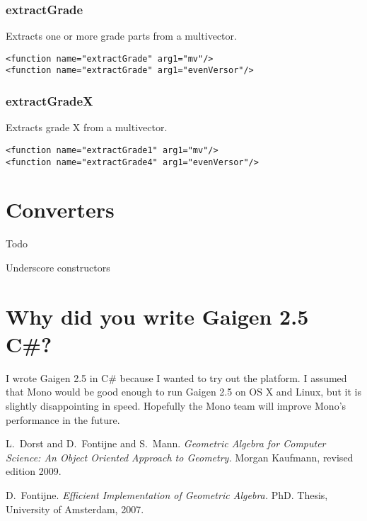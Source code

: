 \documentclass[10pt, a4paper]{article}
\begin{document}
\subsubsection*{extractGrade}

Extracts one or more grade parts from a multivector.
\begin{verbatim}
<function name="extractGrade" arg1="mv"/>
<function name="extractGrade" arg1="evenVersor"/>
\end{verbatim}

\subsubsection*{extractGradeX}

Extracts grade X from a multivector.
\begin{verbatim}
<function name="extractGrade1" arg1="mv"/>
<function name="extractGrade4" arg1="evenVersor"/>
\end{verbatim}


\section{Converters}
\label{s:converters}

Todo

Underscore constructors



\section{Why did you write Gaigen 2.5 C\#?}

I wrote Gaigen 2.5 in C\# because I wanted to try out the platform.
I assumed that Mono would be good enough to run Gaigen 2.5 on OS X and
Linux, but it is slightly disappointing in speed. Hopefully the Mono
team will improve Mono's performance in the future.




\begin{thebibliography}{}


	
 L.~Dorst and D.~Fontijne and S.~Mann.
	\emph{Geometric Algebra for Computer Science: An Object Oriented Approach to Geometry.}
	Morgan Kaufmann, revised edition 2009.

 D.~Fontijne.
	\emph{Efficient Implementation of Geometric Algebra.}
	PhD. Thesis, University of Amsterdam, 2007.


\end{thebibliography}
\end{document}
